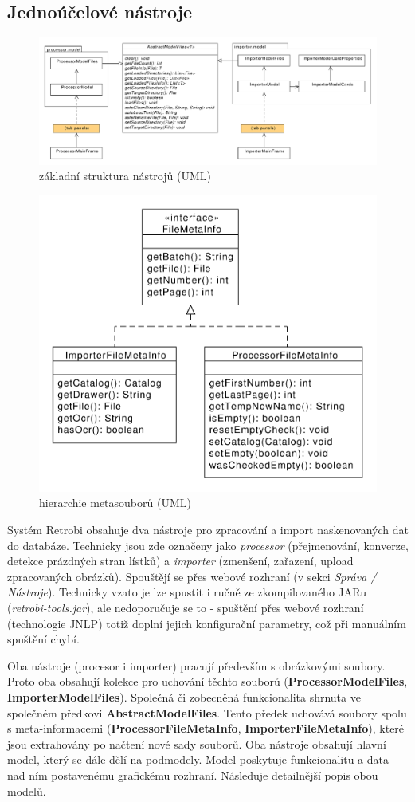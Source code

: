 \subsection{Jednoúčelové nástroje}

\begin{figure}
\label{fig:uml_tools}
\centering
\includegraphics[width=\textwidth]{uml_tools.pdf}
\caption{základní struktura nástrojů (UML)}
\end{figure}

\begin{figure}
\label{fig:uml_files}
\centering
\includegraphics[width=.5\textwidth]{uml_files.pdf}
\caption{hierarchie metasouborů (UML)}
\end{figure}

Systém Retrobi obsahuje dva nástroje pro zpracování a import naskenovaných dat do databáze. Technicky jsou zde označeny jako {\em processor} (přejmenování, konverze, detekce prázdných stran lístků) a {\em importer} (zmenšení, zařazení, upload zpracovaných obrázků). Spouštějí se přes webové rozhraní (v sekci {\em Správa / Nástroje}). Technicky vzato je lze spustit i ručně ze zkompilovaného JARu ({\em retrobi-tools.jar}), ale nedoporučuje se to - spuštění přes webové rozhraní (technologie JNLP) totiž doplní jejich konfigurační parametry, což při manuálním spuštění chybí.

Oba nástroje (procesor i importer) pracují především s obrázkovými soubory. Proto oba obsahují kolekce pro uchování těchto souborů ({\bf ProcessorModelFiles}, {\bf ImporterModelFiles}). Společná či zobecněná funkcionalita shrnuta ve společném předkovi {\bf AbstractModelFiles}. Tento předek uchovává soubory spolu s meta-informacemi ({\bf ProcessorFileMetaInfo}, {\bf ImporterFileMetaInfo}), které jsou extrahovány po načtení nové sady souborů. Oba nástroje obsahují hlavní model, který se dále dělí na podmodely. Model poskytuje funkcionalitu a data nad ním postavenému grafickému rozhraní. Následuje detailnější popis obou modelů.


